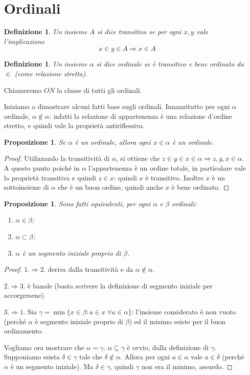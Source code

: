 \documentclass[a4paper,10pt,oneside]{article}
\newcommand{\myname}[1]{\emph{#1}}
\newcommand{\nin}{\not\in}
\theoremstyle{plain}
\newtheorem{mydef}[mytheorem]{Definizione}
\newtheorem{myprop}[mytheorem]{Proposizione}
\theoremstyle{definition}
\theoremstyle{remark}
\begin{document}
\section{Ordinali}

\begin{mydef}
 Un insieme $A$ si dice \myname{transitivo} se per ogni $x,y$ vale l'implicazione 
 \[x\in y \in A \Rightarrow x\in A\]
\end{mydef}

\begin{mydef}
Un insieme $\alpha$ si dice \myname{ordinale} se è transitivo e bene ordinato da $\in$ (come relazione stretta).
\end{mydef}

Chiameremo $ON$ la classe di tutti gli ordinali.

Iniziamo a dimostrare alcuni fatti base sugli ordinali. Innanzitutto per ogni $\alpha$ ordinale, $\alpha \not\in \alpha$: infatti la relazione di appartenenza è una relazione d'ordine stretto, e quindi vale la proprietà antiriflessiva.

\begin{myprop}\label{prop:xinord}
Se $\alpha$ è un ordinale, allora ogni $x\in \alpha$ è un ordinale.
\end{myprop}
\begin{proof}
 Utilizzando la transitività di $\alpha$, si ottiene che $z\in y \in x \in \alpha\Rightarrow z,y,x\in \alpha$. A questo punto poiché in $\alpha$ l'appartenenza è un ordine totale, in particolare vale la proprietà transitiva e quindi $z\in x$: quindi $x$ è transitivo. Inoltre $x$ è un sottoinsieme di $\alpha$ che è un buon ordine, quindi anche $x$ è bene ordinato.
\end{proof}

\begin{myprop}
Sono fatti equivalenti, per ogni $\alpha$ e $ \beta$ ordinali:
\begin{enumerate}
 \item $\alpha \in \beta$;
 \item $\alpha \subset \beta$;
 \item $\alpha$ è un segmento iniziale proprio di $\beta$.
\end{enumerate}
\end{myprop}
\begin{proof}
 $1. \Rightarrow 2.$ deriva dalla transitività e da $\alpha \nin \alpha$. 
 
 $2. \Rightarrow 3.$ è banale (basta scrivere la definizione di segmento iniziale per accorgersene).
 
 $3. \Rightarrow 1.$ Sia $\gamma = \min\{x\in\beta: a\in x \; \forall a\in \alpha \}$: l'insieme considerato è non vuoto (perché $\alpha$ è segmento iniziale proprio di $\beta$) ed il minimo esiste per il buon ordinamento. 
 
 Vogliamo ora mostrare che $\alpha = \gamma$. $\alpha \subseteq \gamma$ è ovvio, dalla definizione di $\gamma$. Supponiamo esista $\delta\in\gamma$ tale che $\delta \nin \alpha$. Allora per ogni $a \in \alpha$ vale $a \in \delta$ (perché $\alpha$ è un segmento iniziale). Ma $\delta \in \gamma$, quindi $\gamma$ non era il minimo, assurdo.
\end{proof}
\end{document}
